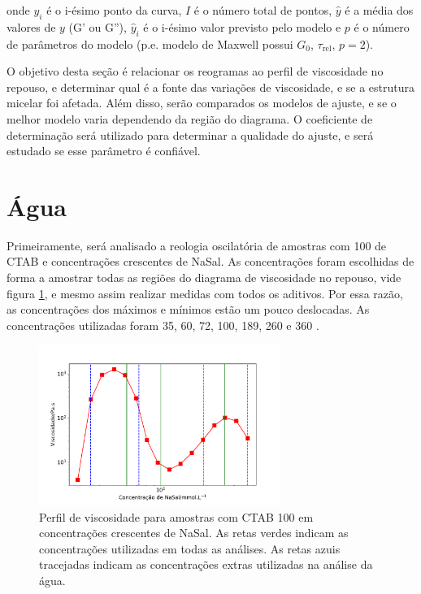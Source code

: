 		\noindent onde \(y_i\) é o i-ésimo ponto da curva, \(I\) é o número total de pontos, \(\hat{y}\) é a média dos valores de \(y\) (G' ou G''), \(\hat{y}_i\) é o i-ésimo valor previsto pelo modelo e \(p\) é o número de parâmetros do modelo (p.e. modelo de Maxwell possui \(G_0\), \(\tau_\mathrm{rel}\), \(p=2\)).
		
		O objetivo desta seção é relacionar os reogramas ao perfil de viscosidade no repouso, e determinar qual é a fonte das variações de viscosidade, e se a estrutura micelar foi afetada. Além disso, serão comparados os modelos de ajuste, e se o melhor modelo varia dependendo da região do diagrama. O coeficiente de determinação será utilizado para determinar a qualidade do ajuste, e será estudado se esse parâmetro é confiável.
		
		\section{Água}
		
		Primeiramente, será analisado a reologia oscilatória de amostras com 100 \mM{} de CTAB e concentrações crescentes de NaSal. As concentrações foram escolhidas de forma a amostrar todas as regiões do diagrama de viscosidade no repouso, vide figura \ref{fig:rh_agua_oscilatorio}, e mesmo assim realizar medidas com todos os aditivos. Por essa razão, as concentrações dos máximos e mínimos estão um pouco deslocadas. As concentrações utilizadas foram 35, 60, 72, 100, 189, 260 e 360 \mM.

		\begin{figure}[h]
			\centering
			\includegraphics[width=0.7\textwidth]{imagens/reologia/RH_agua_oscilatorio}
			\caption{Perfil de viscosidade para amostras com CTAB 100 \mM{} em concentrações crescentes de NaSal. As retas verdes indicam as concentrações utilizadas em todas as análises. As retas azuis tracejadas indicam as concentrações extras utilizadas na análise da água.}
			\label{fig:rh_agua_oscilatorio}
		\end{figure}
		
